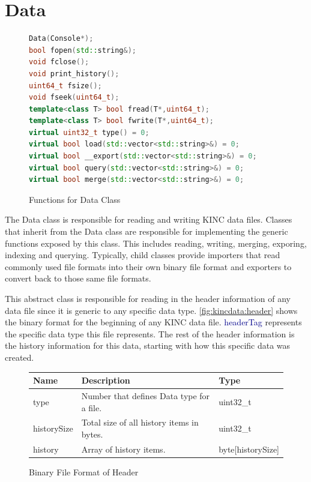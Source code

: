 \documentclass[10pt]{article}
\providecommand{\h}[1]{\textcolor{darkblue}{#1}}
\begin{document}
\newpage
\section{Data}

\begin{figure}[H]
\begin{mdframed}[style=functions]
\begin{lstlisting}[language=C++]
Data(Console*);
bool fopen(std::string&);
void fclose();
void print_history();
uint64_t fsize();
void fseek(uint64_t);
template<class T> bool fread(T*,uint64_t);
template<class T> bool fwrite(T*,uint64_t);
virtual uint32_t type() = 0;
virtual bool load(std::vector<std::string>&) = 0;
virtual bool __export(std::vector<std::string>&) = 0;
virtual bool query(std::vector<std::string>&) = 0;
virtual bool merge(std::vector<std::string>&) = 0;
\end{lstlisting}
\end{mdframed}
\caption{Functions for Data Class}
\label{fig:kincdata}
\end{figure}

The Data class is responsible for reading and writing KINC data files.  
Classes that inherit from the Data class are responsible for implementing 
the generic functions exposed by this class.  This includes reading, writing, 
merging, exporing, indexing and querying. Typically, child classes provide 
importers that read commonly used file formats into their own binary file 
format and exporters to convert back to those same file formats.

This abstract class is responsible for reading in the header information of any 
data file since it is generic to any specific data type. 
\autoref{fig:kincdata:header} shows the binary format for the beginning of any 
KINC data file. \h{headerTag} represents the specific data type this file 
represents. The rest of the header information is the history information for 
this data, starting with how this specific data was created.

\begin{figure}[H]
\begin{mdframed}[style=btable]
\begin{tabularx}{\textwidth}{|l|X|l|}
\hline
\textbf{Name} & \textbf{Description} & \textbf{Type} \\
\hline
type & Number that defines Data type for a file. & uint32\_t \\
\hline
historySize & Total size of all history items in bytes. & uint32\_t \\
\hline
history & Array of history items. & byte[historySize] \\
\hline
\end{tabularx}
\end{mdframed}
\caption{Binary File Format of Header}
\label{fig:kincdata:header}
\end{figure}
\end{document}
